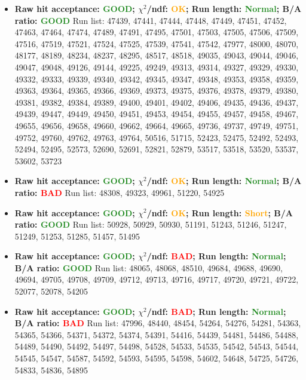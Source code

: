 \documentclass{article}
\begin{document}
\begin{itemize}
\item \textbf{Raw hit acceptance: \textcolor{ForestGreen}{GOOD}; $\chi^{2}$/ndf: \textcolor{Orange}{OK}; Run length: \textcolor{ForestGreen}{Normal}; B/A ratio: \textcolor{ForestGreen}{GOOD}} \newline
Run list: 47439, 47441, 47444, 47448, 47449, 47451, 47452, 47463, 47464, 47474, 47489, 47491, 47495, 47501, 47503, 47505, 47506, 47509, 47516, 47519, 47521, 47524, 47525, 47539, 47541, 47542, 47977, 48000, 48070, 48177, 48189, 48234, 48237, 48295, 48517, 48518, 49035, 49043, 49044, 49046, 49047, 49048, 49126, 49144, 49225, 49249, 49313, 49314, 49327, 49329, 49330, 49332, 49333, 49339, 49340, 49342, 49345, 49347, 49348, 49353, 49358, 49359, 49363, 49364, 49365, 49366, 49369, 49373, 49375, 49376, 49378, 49379, 49380, 49381, 49382, 49384, 49389, 49400, 49401, 49402, 49406, 49435, 49436, 49437, 49439, 49447, 49449, 49450, 49451, 49453, 49454, 49455, 49457, 49458, 49467, 49655, 49656, 49658, 49660, 49662, 49664, 49665, 49736, 49737, 49749, 49751, 49752, 49760, 49762, 49763, 49764, 50516, 51715, 52423, 52475, 52492, 52493, 52494, 52495, 52573, 52690, 52691, 52821, 52879, 53517, 53518, 53520, 53537, 53602, 53723

\item \textbf{Raw hit acceptance: \textcolor{ForestGreen}{GOOD}; $\chi^{2}$/ndf: \textcolor{Orange}{OK}; Run length: \textcolor{ForestGreen}{Normal}; B/A ratio: \textcolor{Red}{BAD}} \newline
Run list: 48308, 49323, 49961, 51220, 54925

\item \textbf{Raw hit acceptance: \textcolor{ForestGreen}{GOOD}; $\chi^{2}$/ndf: \textcolor{Orange}{OK}; Run length: \textcolor{Orange}{Short}; B/A ratio: \textcolor{ForestGreen}{GOOD}} \newline
Run list: 50928, 50929, 50930, 51191, 51243, 51246, 51247, 51249, 51253, 51285, 51457, 51495

\item \textbf{Raw hit acceptance: \textcolor{ForestGreen}{GOOD}; $\chi^{2}$/ndf: \textcolor{Red}{BAD}; Run length: \textcolor{ForestGreen}{Normal}; B/A ratio: \textcolor{ForestGreen}{GOOD}} \newline
Run list: 48065, 48068, 48510, 49684, 49688, 49690, 49694, 49705, 49708, 49709, 49712, 49713, 49716, 49717, 49720, 49721, 49722, 52077, 52078, 54205

\item \textbf{Raw hit acceptance: \textcolor{ForestGreen}{GOOD}; $\chi^{2}$/ndf: \textcolor{Red}{BAD}; Run length: \textcolor{ForestGreen}{Normal}; B/A ratio: \textcolor{Red}{BAD}} \newline
Run list: 47996, 48440, 48454, 54264, 54276, 54281, 54363, 54365, 54366, 54371, 54372, 54374, 54391, 54416, 54439, 54481, 54486, 54488, 54489, 54490, 54492, 54497, 54498, 54528, 54533, 54535, 54542, 54543, 54544, 54545, 54547, 54587, 54592, 54593, 54595, 54598, 54602, 54648, 54725, 54726, 54833, 54836, 54895


\end{itemize}
\end{document}
